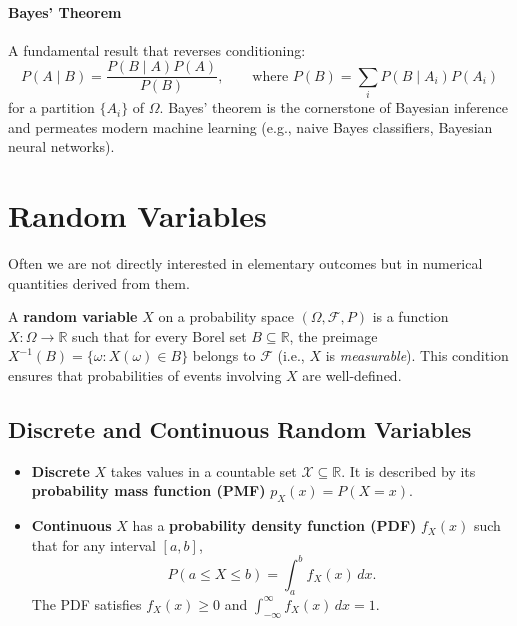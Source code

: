 \documentclass{tufte-handout}
\begin{document}
\paragraph{Bayes' Theorem}
A fundamental result that reverses conditioning:
\[
P(A \mid B) = \frac{P(B \mid A) P(A)}{P(B)}, \qquad \text{where } P(B) = \sum_i P(B \mid A_i)P(A_i)
\]
for a partition $\{A_i\}$ of $\Omega$. Bayes' theorem is the cornerstone of Bayesian inference and permeates modern machine learning (e.g., naive Bayes classifiers, Bayesian neural networks).

\begin{marginfigure}
\centering
{}
\caption{Bayes' theorem relates $P(A|B)$ to $P(B|A)$ via the prior $P(A)$ and evidence $P(B)$.}
\end{marginfigure}

\section{Random Variables}

Often we are not directly interested in elementary outcomes but in numerical quantities derived from them.

\begin{defn}
    A \textbf{random variable} $X$ on a probability space $(\Omega,\mathcal{F},P)$ is a function $X: \Omega \to \mathbb{R}$ such that for every Borel set $B \subseteq \mathbb{R}$, the preimage $X^{-1}(B) = \{\omega: X(\omega) \in B\}$ belongs to $\mathcal{F}$ (i.e., $X$ is \textit{measurable}). This condition ensures that probabilities of events involving $X$ are well-defined.
\end{defn}

\subsection{Discrete and Continuous Random Variables}

\begin{itemize}
    \item \textbf{Discrete} $X$ takes values in a countable set $\mathcal{X} \subseteq \mathbb{R}$. It is described by its \textbf{probability mass function (PMF)} $p_X(x) = P(X = x)$.
    \item \textbf{Continuous} $X$ has a \textbf{probability density function (PDF)} $f_X(x)$ such that for any interval $[a,b]$,
    \[
    P(a \le X \le b) = \int_a^b f_X(x)\,dx.
    \]
    The PDF satisfies $f_X(x) \ge 0$ and $\int_{-\infty}^{\infty} f_X(x)\,dx = 1$.
\end{itemize}
\end{document}
